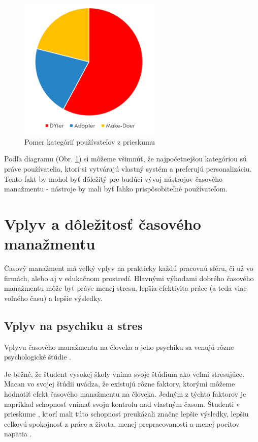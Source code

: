 \documentclass[10pt,slovak,a4paper]{article}
\begin{document}
		\paragraph{}
		\begin{figure}[tbh]
			\centering
			\includegraphics[width=0.6\textwidth]{grafkateg.png}
		\caption{Pomer kategórií používateľov z prieskumu \cite{Haraty}}
		\label{f:kategraf}
		\end{figure}
		
		Podľa diagramu (Obr. \ref{f:kategraf}) si môžeme všimnúť, že najpočetnejšou kategóriou sú práve používatelia, ktorí si vytvárajú vlastný systém a preferujú personalizáciu. Tento fakt by mohol byť dôležitý pre budúci vývoj nástrojov časového manažmentu - nástroje by mali byť ľahko prispôsobiteľné používateľom.
		
\section{Vplyv a dôležitosť časového manažmentu} \label{vplyv_tm}

		Časový manažment má veľký vplyv na prakticky každú pracovnú sféru, či už vo firmách, alebo aj v edukačnom prostredí. Hlavnými výhodami dobrého časového manažmentu môže byť práve menej stresu, lepšia efektivita práce (a teda viac voľného času) a lepšie výsledky.
		
	\subsection{Vplyv na psychiku a stres}
	
		Vplyvu časového manažmentu na človeka a jeho psychiku sa venujú rôzne psychologické štúdie \cite{Macan}.
	
		Je bežné, že študent vysokej školy vníma svoje štúdium ako veľmi stresujúce.
		Macan \cite{Macan} vo svojej štúdii uvádza, že existujú rôzne faktory, ktorými môžeme hodnotiť efekt časového manažmentu na človeka. Jedným  z týchto faktorov je napríklad schopnosť vnímať svoju kontrolu nad vlastným časom. Študenti v prieskume \cite{Macan}, ktorí mali túto schopnosť preukázali značne lepšie výsledky, lepšiu celkovú spokojnosť z práce a života, menej prepracovanosti a menej pocitov napätia \cite{Macan}.
		
\end{document}

